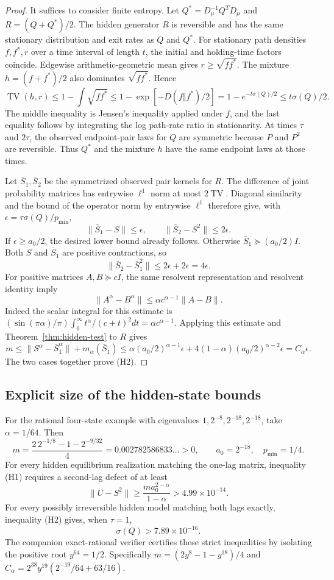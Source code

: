 \begin{proof}
It suffices to consider finite entropy. Let $Q^*=D_\mu^{-1}Q^TD_\mu$
and $R=(Q+Q^*)/2$. The hidden generator $R$ is reversible and has the same
stationary distribution and exit rates as $Q$ and $Q^*$.
For stationary path densities $f,f^*,r$ over a time interval of length $t$,
the initial and holding-time factors coincide. Edgewise arithmetic-geometric
mean gives $r\geq\sqrt{ff^*}$. The mixture $h=(f+f^*)/2$ also dominates
$\sqrt{ff^*}$. Hence
\[
 \operatorname{TV}(h,r)\leq1-\int\sqrt{ff^*}
 \leq1-\exp[-D(f\Vert f^*)/2]
 =1-e^{-t\sigma(Q)/2}\leq t\sigma(Q)/2.
\tag{H3}
\]
The middle inequality is Jensen's inequality applied under $f$, and the
last equality follows by integrating the log path-rate ratio in stationarity.
At times $\tau$ and $2\tau$, the observed endpoint-pair laws for $Q$ are
symmetric because $P$ and $P^2$ are reversible. Thus $Q^*$ and the mixture
$h$ have the same endpoint laws at those times.

Let $\bar S_1,\bar S_2$ be the symmetrized observed pair kernels for $R$.
The difference of joint probability matrices has entrywise $\ell^1$ norm
at most $2\operatorname{TV}$. Diagonal similarity and the bound of the
operator norm by entrywise $\ell^1$ therefore give, with
$\epsilon=\tau\sigma(Q)/p_{\min}$,
\[
 \|\bar S_1-S\|\leq\epsilon,\qquad
 \|\bar S_2-S^2\|\leq2\epsilon.
\]
If $\epsilon\geq a_0/2$, the desired lower bound already follows.
Otherwise $\bar S_1\succeq(a_0/2)I$. Both $S$ and $\bar S_1$ are
positive contractions, so
\[
 \|\bar S_2-\bar S_1^2\|\leq2\epsilon+2\epsilon=4\epsilon.
\]
For positive matrices $A,B\succeq cI$, the same resolvent representation
and resolvent identity imply
\[
 \|A^\alpha-B^\alpha\|
 \leq\alpha c^{\alpha-1}\|A-B\|.
\]
Indeed the scalar integral for this estimate is
$(\sin(\pi\alpha)/\pi)\int_0^\infty t^\alpha/(c+t)^2dt
=\alpha c^{\alpha-1}$.
Applying this estimate and Theorem~\ref{thm:hidden-test} to $R$ gives
\[
 m\leq\|S^\alpha-\bar S_1^\alpha\|
       +m_\alpha(\bar S_1)
 \leq\alpha(a_0/2)^{\alpha-1}\epsilon
       +4(1-\alpha)(a_0/2)^{\alpha-2}\epsilon
 =C_\alpha\epsilon.
\]
The two cases together prove (H2).
\end{proof}

\subsection{Explicit size of the hidden-state bounds}

For the rational four-state example with eigenvalues
$1,2^{-8},2^{-18},2^{-18}$, take $\alpha=1/64$. Then
\[
 m=\frac{2\,2^{-1/8}-1-2^{-9/32}}4
   =0.002782586833\ldots>0,\qquad a_0=2^{-18},\quad p_{\min}=1/4.
\]
For every hidden equilibrium realization matching the one-lag matrix,
inequality (H1) requires a second-lag defect of at least
\[
 \|U-S^2\|\geq\frac{m a_0^{2-\alpha}}{1-\alpha}
  >4.99\times10^{-14}.
\]
For every possibly irreversible hidden model matching both lags exactly,
inequality (H2) gives, when $\tau=1$,
\[
 \sigma(Q)>7.89\times10^{-16}.
\]
The companion exact-rational verifier certifies these strict inequalities
by isolating the positive root $y^{64}=1/2$. Specifically
$m=(2y^8-1-y^{18})/4$ and
$C_\alpha=2^{38}y^{19}(2^{-19}/64+63/16)$.


